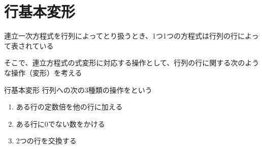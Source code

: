 \documentclass[../../../topic_linear-algebra]{subfiles}
\begin{document}
\sectionline
\section{行基本変形}

連立一次方程式を行列によってとり扱うとき、1つ1つの方程式は行列の行によって表されている

そこで、連立方程式の式変形に対応する操作として、行列の行に関する次のような操作（変形）を考える

\begin{definition}{行基本変形}
  行列への次の3種類の操作をという
  \begin{enumerate}[label=\romanlabel]
    \item ある行の定数倍を他の行に加える
    \item ある行に0でない数をかける
    \item 2つの行を交換する
  \end{enumerate}
\end{definition}
\end{document}
